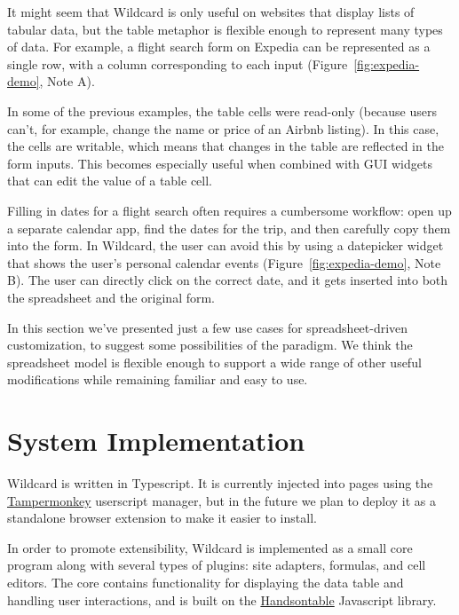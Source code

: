 \documentclass[english,submission]{programming}
\begin{document}
It might seem that Wildcard is only useful on websites that display
lists of tabular data, but the table metaphor is flexible enough to
represent many types of data. For example, a flight search form on
Expedia can be represented as a single row, with a column corresponding
to each input{ (Figure~\ref{fig:expedia-demo}, Note A)}.

In some of the previous examples, the table cells were read-only
(because users can't, for example, change the name or price of an Airbnb
listing). In this case, the cells are writable, which means that changes
in the table are reflected in the form inputs. This becomes especially
useful when combined with GUI widgets that can edit the value of a table
cell.

Filling in dates for a flight search often requires a cumbersome
workflow: open up a separate calendar app, find the dates for the trip,
and then carefully copy them into the form. In Wildcard, the user can
avoid this by using a datepicker widget that shows the user's personal
calendar events{ (Figure~\ref{fig:expedia-demo}, Note B)}. The user can
directly click on the correct date, and it gets inserted into both the
spreadsheet and the original form.

In this section we've presented just a few use cases for
spreadsheet-driven customization, to suggest some possibilities of the
paradigm. We think the spreadsheet model is flexible enough to support a
wide range of other useful modifications while remaining familiar and
easy to use.

\hypertarget{sec:implementation}{%
\section{System Implementation}\label{sec:implementation}}

Wildcard is written in Typescript. It is currently injected into pages
using the \href{https://www.tampermonkey.net/}{Tampermonkey} userscript
manager, but in the future we plan to deploy it as a standalone browser
extension to make it easier to install.

In order to promote extensibility, Wildcard is implemented as a small
core program along with several types of plugins: site adapters,
formulas, and cell editors. The core contains functionality for
displaying the data table and handling user interactions, and is built
on the \href{https://handsontable.com/}{Handsontable} Javascript
library.
\end{document}
